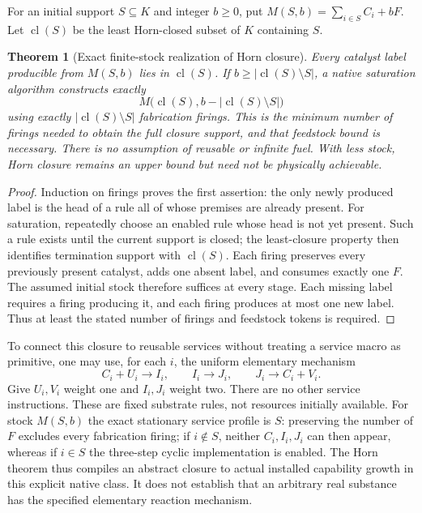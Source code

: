 \documentclass[11pt]{article}
\newtheorem{theorem}{Theorem}[section]
\theoremstyle{definition}
\theoremstyle{remark}
\begin{document}
For an initial support $S\subseteq K$ and integer $b\geq0$, put $M(S,b)=\sum_{i\in S}C_i+bF$. Let $\operatorname{cl}(S)$ be the least Horn-closed subset of $K$ containing $S$.

\begin{theorem}[Exact finite-stock realization of Horn closure]\label{er:thm:horn}
Every catalyst label producible from $M(S,b)$ lies in $\operatorname{cl}(S)$. If $b\geq|\operatorname{cl}(S)\setminus S|$, a native saturation algorithm constructs exactly
\[
 M\bigl(\operatorname{cl}(S),b-|\operatorname{cl}(S)\setminus S|\bigr)
\]
using exactly $|\operatorname{cl}(S)\setminus S|$ fabrication firings. This is the minimum number of firings needed to obtain the full closure support, and that feedstock bound is necessary. There is no assumption of reusable or infinite fuel. With less stock, Horn closure remains an upper bound but need not be physically achievable.
\end{theorem}
\begin{proof}
Induction on firings proves the first assertion: the only newly produced label is the head of a rule all of whose premises are already present. For saturation, repeatedly choose an enabled rule whose head is not yet present. Such a rule exists until the current support is closed; the least-closure property then identifies termination support with $\operatorname{cl}(S)$. Each firing preserves every previously present catalyst, adds one absent label, and consumes exactly one $F$. The assumed initial stock therefore suffices at every stage. Each missing label requires a firing producing it, and each firing produces at most one new label. Thus at least the stated number of firings and feedstock tokens is required.
\end{proof}

To connect this closure to reusable services without treating a service macro as primitive, one may use, for each $i$, the uniform elementary mechanism
\[
 C_i+U_i\to I_i,\qquad I_i\to J_i,\qquad J_i\to C_i+V_i.
\]
Give $U_i,V_i$ weight one and $I_i,J_i$ weight two. There are no other service instructions. These are fixed substrate rules, not resources initially available. For stock $M(S,b)$ the exact stationary service profile is $S$: preserving the number of $F$ excludes every fabrication firing; if $i\notin S$, neither $C_i,I_i,J_i$ can then appear, whereas if $i\in S$ the three-step cyclic implementation is enabled. The Horn theorem thus compiles an abstract closure to actual installed capability growth in this explicit native class. It does not establish that an arbitrary real substance has the specified elementary reaction mechanism.
\end{document}
